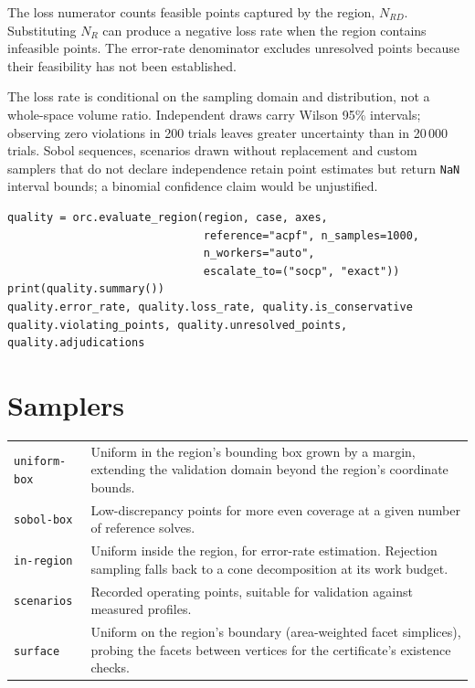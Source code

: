 \documentclass[11pt,a4paper]{report}
\newcommand{\why}[1]{\par\medskip\begingroup\noindent #1\par\endgroup\medskip}
\newcommand{\code}[1]{\texttt{\small #1}}
\begin{document}
\why{The loss numerator counts feasible points captured by the region,
$N_{RD}$. Substituting $N_R$ can produce a negative loss rate when the region
contains infeasible points. The error-rate denominator excludes unresolved
points because their feasibility has not been established.}

The loss rate is conditional on the sampling domain and distribution, not a
whole-space volume ratio. Independent draws carry Wilson 95\% intervals;
observing zero violations in 200 trials leaves greater uncertainty than in
20\,000 trials. Sobol
sequences, scenarios drawn without replacement and custom samplers that do
not declare independence retain point estimates but return \code{NaN}
interval bounds; a binomial confidence claim would be unjustified.

\begin{lstlisting}
quality = orc.evaluate_region(region, case, axes,
                              reference="acpf", n_samples=1000,
                              n_workers="auto",
                              escalate_to=("socp", "exact"))
print(quality.summary())
quality.error_rate, quality.loss_rate, quality.is_conservative
quality.violating_points, quality.unresolved_points, quality.adjudications
\end{lstlisting}

\section{Samplers}

\begin{center}\small
\begin{tabular}{@{}lp{9.5cm}@{}}
\toprule
\code{uniform-box} & Uniform in the region's bounding box grown by a margin,
  extending the validation domain beyond the region's coordinate bounds. \\
\code{sobol-box}   & Low-discrepancy points for more even coverage at a given
  number of reference solves. \\
\code{in-region}   & Uniform inside the region, for error-rate estimation.
  Rejection sampling falls back to a cone decomposition at its work budget. \\
\code{scenarios}   & Recorded operating points, suitable for validation
  against measured profiles. \\
\code{surface}     & Uniform on the region's boundary (area-weighted facet
  simplices), probing the facets between vertices for the certificate's
  existence checks. \\
\bottomrule
\end{tabular}
\end{center}
\end{document}
